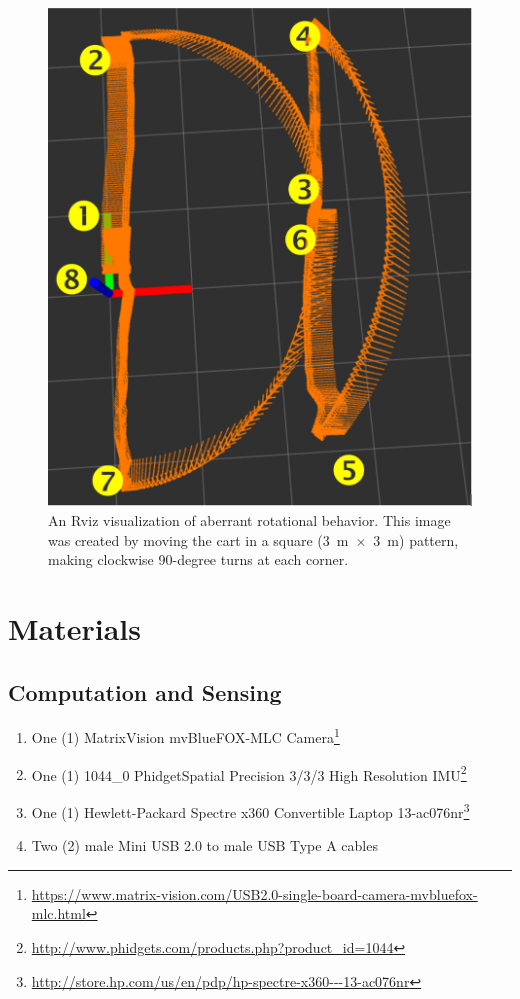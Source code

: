 \begin{figure}
  \centering
    \includegraphics[height=0.8\textwidth]{rot_bug_rviz}
  \caption[Rviz Visualization of Rotational Distortion]{An Rviz visualization of aberrant rotational behavior. This image was created by moving the cart in a square (3~m~$\times$~3~m) pattern, making clockwise 90-degree turns at each corner.}
  \label{fig:rot_bug_rviz}
\end{figure}

\pagebreak
\section{Materials}
\subsection{Computation and Sensing}
\begin{enumerate}
\item One (1) MatrixVision mvBlueFOX-MLC Camera\footnote{\url{https://www.matrix-vision.com/USB2.0-single-board-camera-mvbluefox-mlc.html}}
\item One (1) 1044\_0 PhidgetSpatial Precision 3/3/3 High Resolution IMU\footnote{\url{http://www.phidgets.com/products.php?product_id=1044}}
\item One (1) Hewlett-Packard Spectre x360 Convertible Laptop 13-ac076nr\footnote{\url{http://store.hp.com/us/en/pdp/hp-spectre-x360---13-ac076nr}}
\item Two (2) male Mini USB 2.0 to male USB Type A cables
\end{enumerate}
